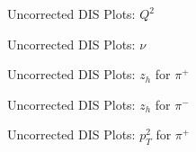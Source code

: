 \begin{frame}{Uncorrected DIS Plots: $Q^2$}
    \label{20.10a::q2}

    \begin{figure}[t]
    \end{figure}

\end{frame}

\begin{frame}{Uncorrected DIS Plots: $\nu$}
    \label{20.10b::nu}

    \begin{figure}[t]
    \end{figure}

\end{frame}

\begin{frame}{Uncorrected DIS Plots: $z_h$ for $\pi^+$}
    \label{20.10c::zh_pi+}

    \begin{figure}[t]
    \end{figure}

\end{frame}

\begin{frame}{Uncorrected DIS Plots: $z_h$ for $\pi^-$}
    \label{20.10d::zh_pi-}

    \begin{figure}[t]
    \end{figure}

\end{frame}

\begin{frame}{Uncorrected DIS Plots: $p_T^2$ for $\pi^+$}
    \label{20.10e::pt2_pi+}

    \begin{figure}[t]
    \end{figure}

\end{frame}


